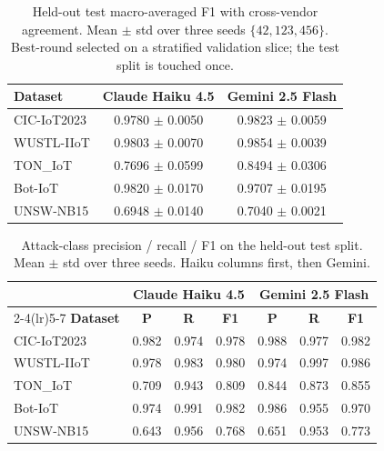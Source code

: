 \begin{table}[H]
\centering
\caption{Held-out test macro-averaged F1 with cross-vendor agreement.
  Mean $\pm$ std over three seeds $\{42, 123, 456\}$.
  Best-round selected on a stratified validation slice; the test split is touched once.}
\label{tab:policy_refinement}
\begin{tabular}{lcc}
\toprule
\textbf{Dataset} & \textbf{Claude Haiku 4.5} & \textbf{Gemini 2.5 Flash} \\
\midrule
CIC-IoT2023 & 0.9780 $\pm$ 0.0050 & 0.9823 $\pm$ 0.0059 \\
WUSTL-IIoT & 0.9803 $\pm$ 0.0070 & 0.9854 $\pm$ 0.0039 \\
TON\_IoT & 0.7696 $\pm$ 0.0599 & 0.8494 $\pm$ 0.0306 \\
Bot-IoT & 0.9820 $\pm$ 0.0170 & 0.9707 $\pm$ 0.0195 \\
UNSW-NB15 & 0.6948 $\pm$ 0.0140 & 0.7040 $\pm$ 0.0021 \\
\bottomrule
\end{tabular}
\end{table}

\begin{table}[htbp]
\centering
\caption{Attack-class precision / recall / F1 on the held-out test split.
  Mean $\pm$ std over three seeds. Haiku columns first, then Gemini.}
\label{tab:attack_precision_current}
\begin{tabular}{lcccccc}
\toprule
 & \multicolumn{3}{c}{\textbf{Claude Haiku 4.5}}
 & \multicolumn{3}{c}{\textbf{Gemini 2.5 Flash}} \\
\cmidrule(lr){2-4}\cmidrule(lr){5-7}
\textbf{Dataset} & \textbf{P} & \textbf{R} & \textbf{F1} & \textbf{P} & \textbf{R} & \textbf{F1} \\
\midrule
CIC-IoT2023 & 0.982 & 0.974 & 0.978 & 0.988 & 0.977 & 0.982 \\
WUSTL-IIoT & 0.978 & 0.983 & 0.980 & 0.974 & 0.997 & 0.986 \\
TON\_IoT & 0.709 & 0.943 & 0.809 & 0.844 & 0.873 & 0.855 \\
Bot-IoT & 0.974 & 0.991 & 0.982 & 0.986 & 0.955 & 0.970 \\
UNSW-NB15 & 0.643 & 0.956 & 0.768 & 0.651 & 0.953 & 0.773 \\
\bottomrule
\end{tabular}
\end{table}

